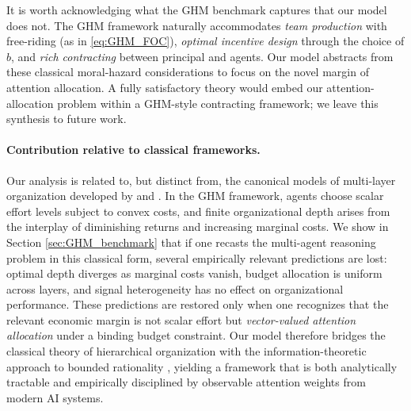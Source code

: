 \begin{remark}
It is worth acknowledging what the GHM benchmark captures that our model does not. The GHM framework naturally accommodates \emph{team production} with free-riding (as in \eqref{eq:GHM_FOC}), \emph{optimal incentive design} through the choice of $b$, and \emph{rich contracting} between principal and agents. Our model abstracts from these classical moral-hazard considerations to focus on the novel margin of attention allocation. A fully satisfactory theory would embed our attention-allocation problem within a GHM-style contracting framework; we leave this synthesis to future work.
\end{remark}



\paragraph{Contribution relative to classical frameworks.}
Our analysis is related to, but distinct from, the canonical models of multi-layer organization developed by \citet{garicano2000hierarchies} and \citet{holmstrom1991multitask}. In the GHM framework, agents choose scalar effort levels subject to convex costs, and finite organizational depth arises from the interplay of diminishing returns and increasing marginal costs. We show in Section \ref{sec:GHM_benchmark} that if one recasts the multi-agent reasoning problem in this classical form, several empirically relevant predictions are lost: optimal depth diverges as marginal costs vanish, budget allocation is uniform across layers, and signal heterogeneity has no effect on organizational performance. These predictions are restored only when one recognizes that the relevant economic margin is not scalar effort but \emph{vector-valued attention allocation} under a binding budget constraint. Our model therefore bridges the classical theory of hierarchical organization with the information-theoretic approach to bounded rationality \citep{sims2003implications}, yielding a framework that is both analytically tractable and empirically disciplined by observable attention weights from modern AI systems.

